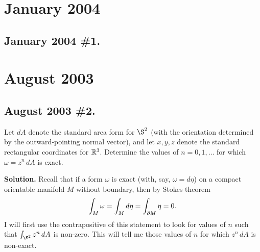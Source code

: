 \documentclass[10pt]{article}
\numberwithin{equation}{subsection}
\begin{document}
\newpage
\section{January 2004}

\subsection{January 2004 \#1.}

\newpage
\section{August 2003}

\subsection{August 2003 \#2.}

Let $dA$ denote the standard area form for $\S^2$ (with the orientation
determined by the outward-pointing normal vector), and let $x,y,z$ denote the
standard rectangular coordinates for $\mathbb{R}^3$.  Determine the values of
$n=0,1,\ldots$ for which $\omega=z^n\,dA$ is exact.

\textbf{Solution.}  Recall that if a form $\omega$ is exact (with, say,
$\omega=d\eta$) on a compact orientable manifold $M$ without boundary, then by
Stokes theorem
$$
	\int_M \omega = \int_M d\eta = \int_{\partial M} \eta = 0.
$$
I will first use the contrapositive of this statement to look for values of $n$
such that $\int_{\S^2} z^n\,dA$ is non-zero.  This will tell me those values of
$n$ for which $z^n\,dA$ is non-exact.
\end{document}
